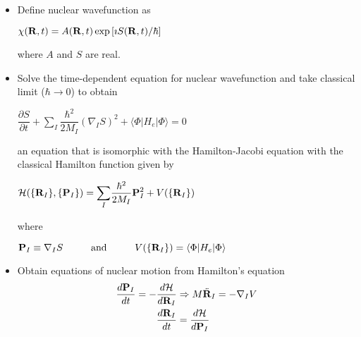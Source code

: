 \documentclass[slidestop,mathserif,compress,xcolor=svgnames]{beamer}
\begin{document}
\begin{frame}[allowframebreaks]
  \begin{itemize}
  \item Define nuclear wavefunction as
    \begin{center}
      $\chi({\bf R},t) = A({\bf R},t)\exp\left[\imath S({\bf R},t)/\hbar\right]$
    \end{center}
    where $A$ and $S$ are real.
  \item Solve the time-dependent equation for nuclear wavefunction and take classical limit ($\hbar\rightarrow0$) to obtain 
    \begin{center}
      $\displaystyle{\dfrac{\partial S}{\partial t} + \sum_I\dfrac{\hbar^2}{2M_I}(\nabla_IS)^2 + \langle\Phi|H_e|\Phi\rangle = 0}$
    \end{center}
    an equation that is isomorphic with the Hamilton-Jacobi equation with the classical Hamilton function given by
    \begin{center}
      $\mathcal{H}(\{{\bf R}_I\},\{{\bf P}_I\}) = \displaystyle{\sum_I} \dfrac{\hbar^2}{2M_I}{\bf P}^2_I + V(\{{\bf R}_I\})$
    \end{center}
    where
    \begin{center}
      ${\bf P}_I \equiv \nabla_IS\hspace{1cm}\mathrm{and}\hspace{1cm}
      V(\{{\bf R}_I\}) = \langle\Phi|H_e|\Phi\rangle$
    \end{center}
  \item Obtain equations of nuclear motion from Hamilton's equation
    \begin{align*}
      \dfrac{d{\bf P}_I}{dt} = -\dfrac{d\mathcal{H}}{d{\bf R}_I}&\Rightarrow M\ddot{\bf R}_I = -\nabla _IV\\
      \dfrac{d{\bf R}_I}{dt} &= \dfrac{d\mathcal{H}}{d{\bf P}_I}
    \end{align*}
  \end{itemize}
\end{frame}
\end{document}
